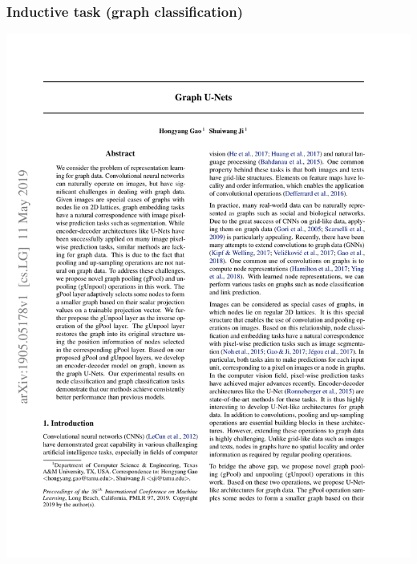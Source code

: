 \documentclass[12pt,aspectratio=169]{beamer}
\begin{document}
    \begin{frame}
        \frametitle{Inductive task (graph classification)}

        \centering
        \includegraphics[page=7,trim=1cm 16cm 1cm 7.2cm,clip,scale=0.7]{Graph U-Net.pdf}
    \end{frame}
\end{document}
